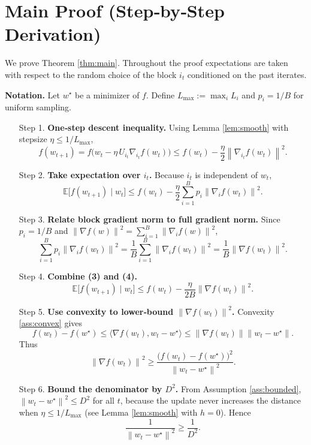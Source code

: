 \documentclass{article}
\newcommand{\EE}{\mathbb{E}}
\newcommand{\norm}[1]{\left\|#1\right\|}
\newcommand{\grad}[1]{\nabla_{#1}}
\begin{document}
\section*{Main Proof (Step‑by‑Step Derivation)}
We prove Theorem \ref{thm:main}.  Throughout the proof expectations are taken
with respect to the random choice of the block $i_t$ conditioned on the past
iterates.

\noindent\textbf{Notation.} Let $w^{\star}$ be a minimizer of $f$.
Define $L_{\max}:=\max_i L_i$ and $p_i=1/B$ for uniform sampling.

\begin{enumerate}
\item[Step 1.] \textbf{One‑step descent inequality.}  
Using Lemma \ref{lem:smooth} with stepsize $\eta\le 1/L_{\max}$,
\[
f(w_{t+1})
= f\!\bigl(w_t-\eta\,U_{i_t}\grad{i_t}f(w_t)\bigr)
\le f(w_t)-\frac{\eta}{2}\norm{\grad{i_t}f(w_t)}^{2}.
\tag{2}
\]

\item[Step 2.] \textbf{Take expectation over $i_t$.}  
Because $i_t$ is independent of $w_t$,
\[
\EE\!\bigl[f(w_{t+1})\mid w_t\bigr]
\le f(w_t)-\frac{\eta}{2}\sum_{i=1}^{B}p_i\norm{\grad{i}f(w_t)}^{2}.
\tag{3}
\]

\item[Step 3.] \textbf{Relate block gradient norm to full gradient norm.}  
Since $p_i=1/B$ and $\norm{\nabla f(w)}^{2}
   =\sum_{i=1}^{B}\norm{\grad{i}f(w)}^{2}$,
\[
\sum_{i=1}^{B}p_i\norm{\grad{i}f(w_t)}^{2}
= \frac1B\sum_{i=1}^{B}\norm{\grad{i}f(w_t)}^{2}
= \frac1B\norm{\nabla f(w_t)}^{2}.
\tag{4}
\]

\item[Step 4.] \textbf{Combine (3) and (4).}
\[
\EE\!\bigl[f(w_{t+1})\mid w_t\bigr]
\le f(w_t)-\frac{\eta}{2B}\norm{\nabla f(w_t)}^{2}.
\tag{5}
\]

\item[Step 5.] \textbf{Use convexity to lower‑bound $\norm{\nabla f(w_t)}^{2}$.}  
Convexity \eqref{ass:convex} gives
\[
f(w_t)-f(w^{\star})\le\langle\nabla f(w_t),w_t-w^{\star}\rangle
\le \norm{\nabla f(w_t)}\norm{w_t-w^{\star}}.
\tag{6}
\]
Thus
\[
\norm{\nabla f(w_t)}^{2}
\ge \frac{\bigl(f(w_t)-f(w^{\star})\bigr)^{2}}{\norm{w_t-w^{\star}}^{2}}.
\tag{7}
\]

\item[Step 6.] \textbf{Bound the denominator by $D^{2}$.}  
From Assumption \ref{ass:bounded}, $\norm{w_t-w^{\star}}^{2}\le D^{2}$ for all $t$,
because the update never increases the distance when $\eta\le 1/L_{\max}$
(see Lemma \ref{lem:smooth} with $h=0$). Hence
\[
\frac{1}{\norm{w_t-w^{\star}}^{2}}\ge\frac{1}{D^{2}}.
\tag{8}
\]


\end{enumerate}
\end{document}
